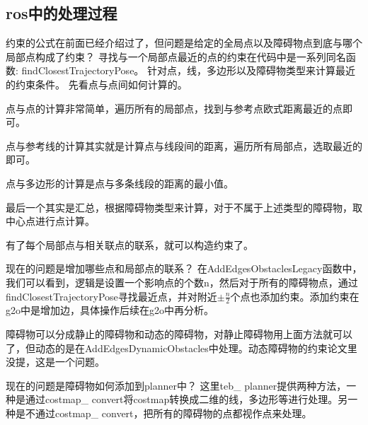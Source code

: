 \documentclass[10pt,a4paper]{article}
\theoremstyle{mythm}
\numberwithin{equation}{section}
\begin{document}
\subsection{ros中的处理过程}
约束的公式在前面已经介绍过了，但问题是给定的全局点以及障碍物点到底与哪个局部点构成了约束？
寻找与一个局部点最近的点的约束在代码中是一系列同名函数:
findClosestTrajectoryPose。
针对点，线，多边形以及障碍物类型来计算最近的约束条件。
先看点与点间如何计算的。

点与点的计算非常简单，遍历所有的局部点，找到与参考点欧式距离最近的点即可。

点与参考线的计算其实就是计算点与线段间的距离，遍历所有局部点，选取最近的即可。

点与多边形的计算是点与多条线段的距离的最小值。

最后一个其实是汇总，根据障碍物类型来计算，对于不属于上述类型的障碍物，取中心点进行点计算。

有了每个局部点与相关联点的联系，就可以构造约束了。

现在的问题是增加哪些点和局部点的联系？
在AddEdgesObstaclesLegacy函数中，我们可以看到，逻辑是设置一个影响点的个数n，然后对于所有的障碍物点，通过findClosestTrajectoryPose寻找最近点，并对附近$±\frac{n}{2}$个点也添加约束。添加约束在g2o中是增加边，具体操作后续在g2o中再分析。

障碍物可以分成静止的障碍物和动态的障碍物，对静止障碍物用上面方法就可以了，但动态的是在AddEdgesDynamicObstacles中处理。动态障碍物的约束论文里没提，这是一个问题。

现在的问题是障碍物如何添加到planner中？
这里teb\_ planner提供两种方法，一种是通过costmap\_ convert将costmap转换成二维的线，多边形等进行处理。另一种是不通过costmap\_ convert，把所有的障碍物的点都视作点来处理。
\end{document}
